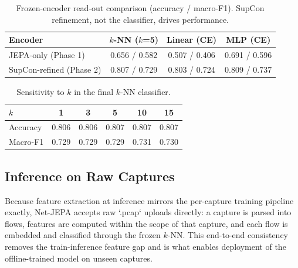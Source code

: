 \documentclass{article}
\begin{document}
\begin{table}[h]
  \caption{Frozen-encoder read-out comparison (accuracy / macro-F1). SupCon refinement, not the classifier, drives performance.}
  \label{tab:readout}
  \centering
  \begin{tabular}{lccc}
    \toprule
    Encoder & $k$-NN ($k$=5) & Linear (CE) & MLP (CE) \\
    \midrule
    JEPA-only (Phase 1)        & 0.656 / 0.582 & 0.507 / 0.406 & 0.691 / 0.596 \\
    SupCon-refined (Phase 2)   & 0.807 / 0.729 & 0.803 / 0.724 & 0.809 / 0.737 \\
    \bottomrule
  \end{tabular}
\end{table}

\begin{table}[h]
  \caption{Sensitivity to $k$ in the final $k$-NN classifier.}
  \label{tab:ksweep}
  \centering
  \begin{tabular}{lccccc}
    \toprule
    $k$ & 1 & 3 & 5 & 10 & 15 \\
    \midrule
    Accuracy & 0.806 & 0.806 & 0.807 & 0.807 & 0.807 \\
    Macro-F1 & 0.729 & 0.729 & 0.729 & 0.731 & 0.730 \\
    \bottomrule
  \end{tabular}
\end{table}

\subsection{Inference on Raw Captures}
Because feature extraction at inference mirrors the per-capture training pipeline exactly, Net-JEPA accepts raw `.pcap` uploads directly: a capture is parsed into flows, features are computed within the scope of that capture, and each flow is embedded and classified through the frozen $k$-NN. This end-to-end consistency removes the train-inference feature gap and is what enables deployment of the offline-trained model on unseen captures.
\end{document}
